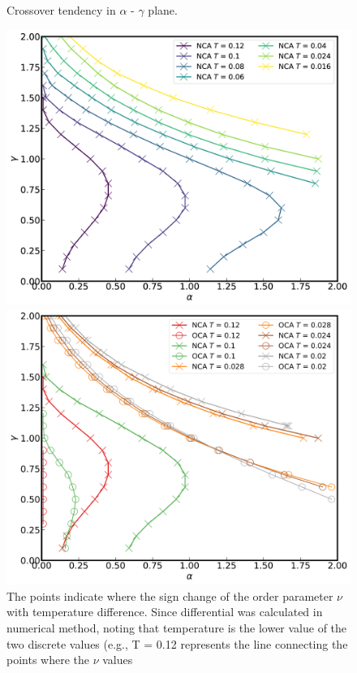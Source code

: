 \documentclass{article}[12pt]
\numberwithin{equation}{section}
\begin{document}
\begin{spacing}{1.5}
\begin{figure}[H]
  \caption{Crossover tendency in $\alpha$ - $\gamma$ plane.}
\end{figure}
\pagebreak
\newpage
\begin{figure}[H]
  \centerline{\includegraphics[width=13cm]{TexFigure/4/4_3_08_3dplot_Ns3_proj_n-1.png}}
  \centerline{\includegraphics[width=13cm]{TexFigure/4/4_3_09_3dplot_COMP3_proj_n-1.png}}
  \caption{The points indicate where the sign change of the order parameter $\nu$ with temperature difference. Since differential was calculated in numerical method, noting that temperature is the lower value of the two discrete values 
  (e.g., T = 0.12 represents the line connecting the points where the $\nu$ values 
}
\end{figure}
\end{spacing}
\end{document}

